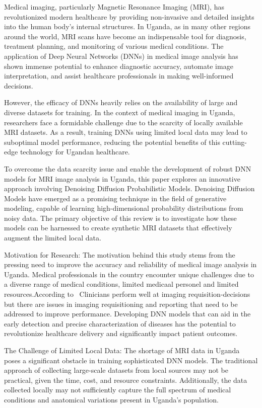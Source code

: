 Medical imaging, particularly Magnetic Resonance Imaging (MRI), has revolutionized modern healthcare by providing non-invasive and detailed insights into the human body's internal structures. In Uganda, as in many other regions around the world, MRI scans have become an indispensable tool for diagnosis, treatment planning, and monitoring of various medical conditions. The application of Deep Neural Networks (DNNs) in medical image analysis has shown immense potential to enhance diagnostic accuracy, automate image interpretation, and assist healthcare professionals in making well-informed decisions.

However, the efficacy of DNNs heavily relies on the availability of large and diverse datasets for training.\cite{ahishakiye2021survey} In the context of medical imaging in Uganda, researchers face a formidable challenge due to the scarcity of locally available MRI datasets. As a result, training DNNs using limited local data may lead to suboptimal model performance, reducing the potential benefits of this cutting-edge technology for Ugandan healthcare.

To overcome the data scarcity issue and enable the development of robust DNN models for MRI image analysis in Uganda, this paper explores an innovative approach involving Denoising Diffusion Probabilistic Models.\cite{ho2020denoising} Denoising Diffusion Models have emerged as a promising technique in the field of generative modeling, capable of learning high-dimensional probability distributions from noisy data. The primary objective of this review is to investigate how these models can be harnessed to create synthetic MRI datasets that effectively augment the limited local data.

Motivation for Research:
The motivation behind this study stems from the pressing need to improve the accuracy and reliability of medical image analysis in Uganda. Medical professionals in the country encounter unique challenges due to a diverse range of medical conditions, limited medicaal personel and limited resources.According to~\cite{kawooya2012assessing} Clinicians perform well at imaging requisition-decisions but there are issues in imaging requisitioning and reporting that need to be addressed to improve performance. Developing DNN models that can aid in the early detection and precise characterization of diseases has the potential to revolutionize healthcare delivery and significantly impact patient outcomes.

The Challenge of Limited Local Data:
The shortage of MRI data in Uganda poses a significant obstacle in training sophisticated DNN models. The traditional approach of collecting large-scale datasets from local sources may not be practical, given the time, cost, and resource constraints. Additionally, the data collected locally may not sufficiently capture the full spectrum of medical conditions and anatomical variations present in Uganda's population.

